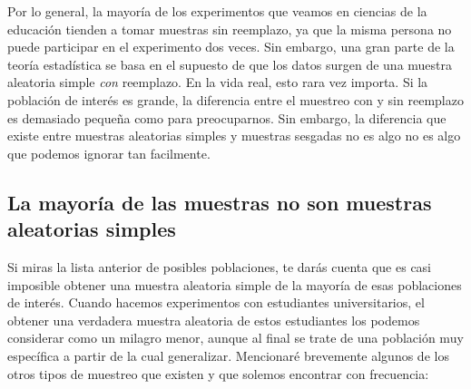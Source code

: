 \documentclass[spanish,]{book}
\begin{document}
Por lo general, la mayoría de los experimentos que veamos en ciencias de
la educación tienden a tomar muestras sin reemplazo, ya que la misma
persona no puede participar en el experimento dos veces. Sin embargo,
una gran parte de la teoría estadística se basa en el supuesto de que
los datos surgen de una muestra aleatoria simple \emph{con} reemplazo.
En la vida real, esto rara vez importa. Si la población de interés es
grande, la diferencia entre el muestreo con y sin reemplazo es demasiado
pequeña como para preocuparnos. Sin embargo, la diferencia que existe
entre muestras aleatorias simples y muestras sesgadas no es algo no es
algo que podemos ignorar tan facilmente.

\subsection{La mayoría de las muestras no son muestras aleatorias
simples}\label{la-mayoria-de-las-muestras-no-son-muestras-aleatorias-simples}

Si miras la lista anterior de posibles poblaciones, te darás cuenta que
es casi imposible obtener una muestra aleatoria simple de la mayoría de
esas poblaciones de interés. Cuando hacemos experimentos con estudiantes
universitarios, el obtener una verdadera muestra aleatoria de estos
estudiantes los podemos considerar como un milagro menor, aunque al
final se trate de una población muy específica a partir de la cual
generalizar. Mencionaré brevemente algunos de los otros tipos de
muestreo que existen y que solemos encontrar con frecuencia:
\end{document}
